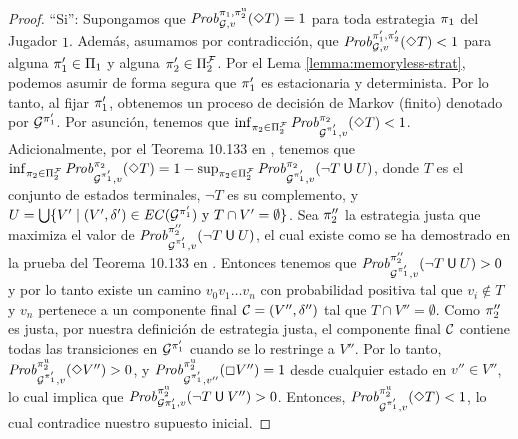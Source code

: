 \begin{proof}
``Si'': Supongamos que $\mathit{Prob}^{\pi_{1}, \pi^{\mathrm{u}}_{2}}_{\mathcal{G},v}(\Diamond T)=1$ para toda estrategia $\pi_{1}$ del Jugador $1$.  Además, 
asumamos por contradicción, que
$\mathit{Prob}^{\pi_{1}', \pi_{2}'}_{\mathcal{G},v}(\Diamond T) < 1$ para alguna $\pi_{1}'\in \Pi_{1}$ y alguna $\pi_{2}'\in \Pi^{\mathcal{F}}_{2}$. 
Por el Lema \ref{lemma:memoryless-strat}, podemos asumir de forma segura que $\pi_{1}'$ es estacionaria y determinista.
Por lo tanto, al fijar $\pi_{1}'$, obtenemos un proceso de decisión de Markov (finito) denotado por $\mathcal{G}^{\pi_{1}'}$.
Por asunción, tenemos que
$\inf_{\pi_{2} \in \Pi^{\mathcal{F}}_{2}} \mathit{Prob}^{\pi_{2}}_{\mathcal{G}^{\pi_{1}'},v}(\Diamond T) < 1 $. Adicionalmente, por el Teorema 10.133 en \cite{BaierK08}, tenemos que $\inf_{ \pi_{2} \in \Pi^{\mathcal{F}}_{2}}\mathit{Prob}^{\pi_{2}}_{\mathcal{G}^{\pi_{1}'},v}(\Diamond T) = 1 - \sup_{\pi_{2} \in \Pi^{\mathcal{F}}_{2}} \mathit{Prob}^{\pi_{2}}_{\mathcal{G}^{\pi_{1}'},v}(\neg T \mathbin{\textsf{U}} U)$, donde $T$ es el conjunto de estados terminales,  $\neg T$ es su complemento, y
$U = \bigcup \{ V' \mid (V', \delta') \in \mathit{EC}(\mathcal{G}^{\pi_{1}'}) \text{ y }  T \cap V' = \emptyset\}$.
Sea $\pi_{2}''$ la estrategia justa que maximiza el valor de $\mathit{Prob}^{\pi_{2}''}_{\mathcal{G}^{\pi_{1}'},v}(\neg T \mathbin{\textsf{U}} U)$, el cual existe como se ha demostrado en la prueba del Teorema 10.133 en \cite{BaierK08}.
Entonces tenemos que $\mathit{Prob}^{\pi_{2}''}_{\mathcal{G}^{\pi_{1}'},v}(\neg T \mathbin{\textsf{U}} U) > 0$ y por lo tanto existe
un camino $v_0 v_1 \dots v_n$ con probabilidad positiva tal que $v_i \notin T$ y $v_n$ pertenece a un componente final $\mathcal{C} = (V'', \delta'')$
tal que $T \cap V'' = \emptyset$. Como $\pi_{2}''$ es justa, por nuestra definición de estrategia justa, el componente final $\mathcal{C}$ contiene todas las transiciones en $\mathcal{G}^{\pi_{1}'}$ cuando se lo restringe a $V''$.
Por lo tanto, $\mathit{Prob}^{\pi^{\mathrm{u}}_{2}}_{\mathcal{G}^{\pi_{1}'},v}(\Diamond V'') > 0$, y 
$\mathit{Prob}^{\pi^{\mathrm{u}}_{2}}_{\mathcal{G}^{\pi_{1}'},v''}(\Box V'') = 1 $ 
desde cualquier estado en $v'' \in V''$, lo cual implica que $\mathit{Prob}^{\pi^{\mathrm{u}}_{2}}_{\mathcal{G}{\pi_{1}'},v}(\neg T \mathbin{\textsf{U}} V'') > 0$. 
Entonces, $\mathit{Prob}^{\pi^{\mathrm{u}}_{2}}_{\mathcal{G}^{\pi_{1}'},v}(\Diamond T) < 1$, lo cual contradice nuestro supuesto inicial.


\end{proof}
